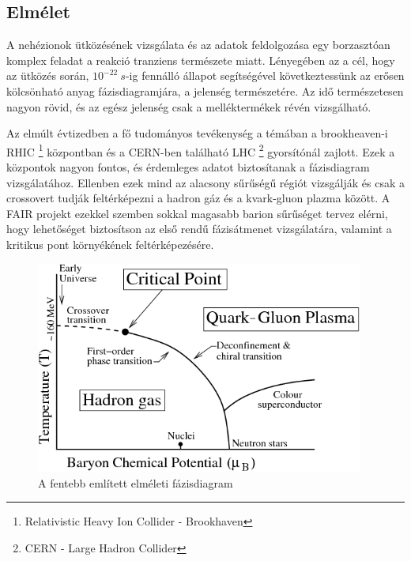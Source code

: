 \documentclass[a4paper,12pt]{article}
\begin{document}
\subsection{ Elmélet}
\vspace{5mm}
\par A nehézionok ütközésének vizsgálata és az adatok feldolgozása egy borzasztóan komplex feladat a reakció tranziens természete miatt. 
Lényegében az a cél, hogy az ütközés során, $10^{-22}~s$-ig fennálló állapot segítségével következtessünk az erősen kölcsönható anyag 
fázisdiagramjára, a jelenség természetére. Az idő természetesen nagyon rövid, és az egész jelenség csak a melléktermékek révén vizsgálható. 
\par  Az elmúlt évtizedben a fő tudományos tevékenység a témában a brookheaven-i RHIC  \footnote{ Relativistic Heavy Ion Collider - Brookhaven } központban 
és a CERN-ben található LHC \footnote{ CERN - Large Hadron Collider } gyorsítónál zajlott. Ezek a központok nagyon fontos, és érdemleges 
adatot biztosítanak a fázisdiagram vizsgálatához. Ellenben ezek mind az alacsony sűrűségű régiót vizsgálják és csak a crossovert tudják
feltérképezni a hadron gáz és a kvark-gluon plazma között. A FAIR projekt ezekkel szemben sokkal magasabb barion sűrűséget tervez elérni, hogy 
lehetőséget biztosítson az első rendű fázisátmenet vizsgálatára, valamint a kritikus pont környékének feltérképezésére. 
\begin{figure}[H]
	\centering
	\includegraphics[width=0.96\textwidth]{CBM_phase_trans.png}
	\caption{ A fentebb említett elméleti fázisdiagram  }
\end{figure}
\end{document}
